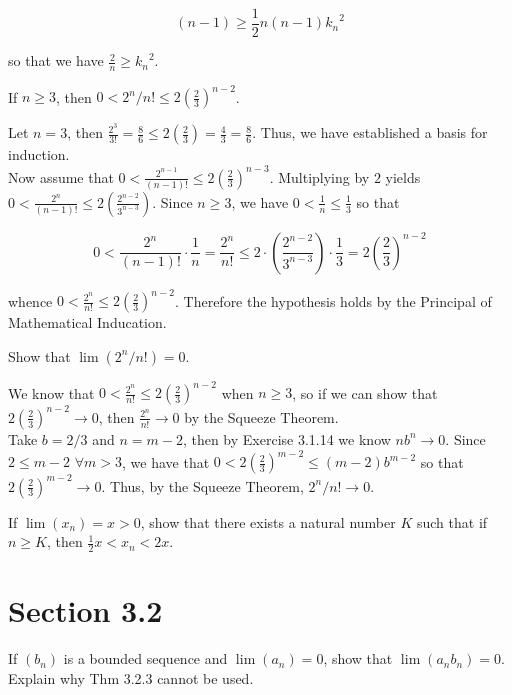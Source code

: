 \documentclass[paper=a4, fontsize=11pt]{scrartcl} %
\numberwithin{equation}{section} %
\numberwithin{figure}{section} %
\numberwithin{table}{section} %
\begin{document}
\begin{equation*}
(n - 1) \geq \frac{1}{2} n (n - 1) {k_n}^2
\end{equation*}

so that we have $\frac{2}{n} \geq {k_n}^2$.

 If $n \geq 3$, then $0 < 2^n/n! \leq 2(\frac{2}{3})^{n-2}$.

\pf Let $n = 3$, then $\frac{2^3}{3!} = \frac{8}{6} \leq 2(\frac{2}{3}) = \frac{4}{3} = \frac{8}{6}$. Thus, we have established a basis for induction.\\

Now assume that $0 < \frac{2^{n-1}}{(n-1)!} \leq 2\left(\frac{2}{3}\right)^{n-3}$. Multiplying by $2$ yields $ 0 < \frac{2^n}{(n-1)!} \leq 2\left(\frac{2^{n-2}}{3^{n-3}}\right)$. Since $n \geq 3$, we have $0 < \frac{1}{n} \leq \frac{1}{3}$ so that

\begin{equation*}
0 < \frac{2^n}{(n-1)!} \cdot \frac{1}{n} = \frac{2^n}{n!} \leq 2 \cdot \left(\frac{2^{n-2}}{3^{n-3}}\right) \cdot \frac{1}{3} = 2 \left( \frac{2}{3} \right)^{n-2} 
\end{equation*}

whence $0 < \frac{2^n}{n!} \leq 2\left(\frac{2}{3}\right)^{n-2}$. Therefore the hypothesis holds by the Principal of Mathematical Inducation. \done

 Show that $\lim(2^n/n!) = 0$.

\pf We know that $0 < \frac{2^n}{n!} \leq 2\left(\frac{2}{3}\right)^{n-2}$ when $n \geq 3$, so if we can show that $2\left(\frac{2}{3}\right)^{n-2} \rightarrow 0$, then $\frac{2^n}{n!} \rightarrow 0$ by the Squeeze Theorem.\\

Take $b = 2/3$ and $n = m - 2$, then by Exercise 3.1.14 we know $nb^n \rightarrow 0$. Since $2 \leq m - 2$ $\forall m > 3$, we have that $0 < 2(\frac{2}{3})^{m-2} \leq (m-2)b^{m-2}$ so that $2\left(\frac{2}{3}\right)^{m-2} \rightarrow 0$. Thus, by the Squeeze Theorem, $2^n / n! \rightarrow 0$. \done

 If $\lim(x_n) = x > 0$, show that there exists a natural number $K$ such that if $n \geq K$, then $\frac{1}{2}x < x_n < 2x$.
\pf

\section*{Section 3.2}
 If $(b_n)$ is a bounded sequence and $\lim(a_n) = 0$, show that $\lim(a_n b_n) = 0$. Explain why Thm 3.2.3 cannot be used.
\pf
\end{document}
